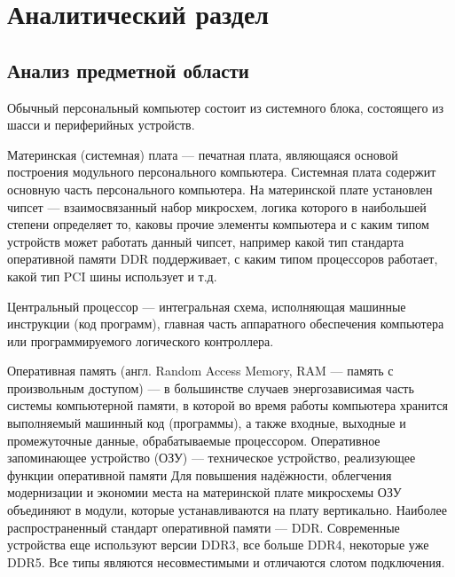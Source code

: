 \chapter{Аналитический раздел}

\section{Анализ предметной области}
Обычный персональный компьютер состоит из системного блока, состоящего из шасси и периферийных устройств.

Материнская (системная) плата --- печатная плата, являющаяся основой построения модульного персонального компьютера.
Системная плата содержит основную часть персонального компьютера.
На материнской плате установлен чипсет --- взаимосвязанный набор микросхем, логика которого в наибольшей степени определяет то, каковы прочие элементы компьютера и с каким типом устройств может работать данный чипсет, например какой тип стандарта оперативной памяти DDR поддерживает, с каким типом процессоров работает, какой тип PCI шины использует и т.д.

Центральный процессор --- интегральная схема, исполняющая машинные инструкции (код программ), главная часть аппаратного обеспечения компьютера или программируемого логического контроллера. 

Оперативная память (англ. Random Access Memory, RAM --- память с произвольным доступом) --- в большинстве случаев энергозависимая часть системы компьютерной памяти, в которой во время работы компьютера хранится выполняемый машинный код (программы), а также входные, выходные и промежуточные данные, обрабатываемые процессором. Оперативное запоминающее устройство (ОЗУ) --- техническое устройство, реализующее функции оперативной памяти
Для повышения надёжности, облегчения модернизации и экономии места на материнской плате микросхемы ОЗУ объединяют в модули, которые устанавливаются на плату вертикально.
Наиболее распространенный стандарт оперативной памяти --- DDR. Современные устройства еще используют версии DDR3, все больше DDR4, некоторые уже DDR5. Все типы являются несовместимыми и отличаются слотом подключения. 


